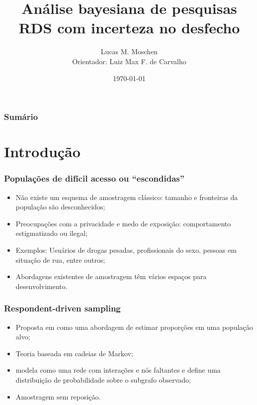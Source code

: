 \documentclass{beamer}
\title[Respondent driven-sampling]
{Análise bayesiana de pesquisas RDS com incerteza no desfecho}
\author[Lucas Moschen]
{Lucas M. Moschen \\ Orientador: Luiz Max F. de Carvalho}
\institute[EMAp/FGV]
{
  Escola de Matemática Aplicada\\
  Fundação Getulio Vargas
}
\date[\today]
{\today}
\newcommand{\Space}{\vspace{3ex}}
\begin{document}
\frame{\titlepage}

\begin{frame}
\frametitle{Sumário}
\tableofcontents
\end{frame}

\section{Introdução}


\begin{frame}
\frametitle{Populações de difícil acesso ou ``escondidas''}

\begin{itemize}
    \justifying
    \item Não existe um esquema de amostragem clássico: tamanho e fronteiras da
    população são desconhecidos;
    \Space
    \item Preocupações com a privacidade e medo de exposição: comportamento
    estigmatizado ou ilegal;
    \Space
    \item Exemplos: Usuários de drogas pesadas, profissionais do sexo, pessoas
    em situação de rua, entre outros;
    \Space 
    \item Abordagens existentes de amostragem têm vários espaços para
    desenvolvimento.
\end{itemize}

\end{frame}

\begin{frame}
\frametitle{Respondent-driven sampling}

  \begin{itemize}
    \justifying
    \item Proposta em \cite{heckathorn1997} como uma abordagem de estimar
    proporções em uma população alvo; 

    \Space

    \item Teoria baseada em cadeias de Markov; 
    
    \Space
    
    \item \cite{crawford2016} modela como uma rede com interações e nós
    faltantes e define uma distribuição de probabilidade sobre o subgrafo
    observado;
    
    \Space 

    \item Amostragem sem reposição. 

  \end{itemize}

\end{frame}
\end{document}

